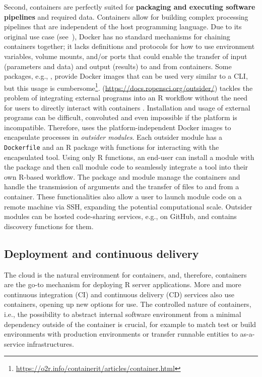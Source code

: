 \label{pipelines} Second, containers are perfectly suited for
\textbf{packaging and executing software pipelines} and required data.
Containers allow for building complex processing pipelines that are
independent of the host programming language. Due to its original use
case (see~), Docker has no standard mechanisms for
chaining containers together; it lacks definitions and protocols for how
to use environment variables, volume mounts, and/or ports that could
enable the transfer of input (parameters and data) and output (results)
to and from containers. Some packages, e.g., , provide
Docker images that can be used very similar to a CLI, but this usage is
cumbersome\footnote{\href{https://o2r.info/containerit/articles/container.html}{https://o2r.info/containerit/articles/container.html}}.
\textbf{} (\url{https://docs.ropensci.org/outsider/})
tackles the problem of integrating external programs into an R workflow
without the need for users to directly interact with containers
\citep{bennett_outsider_2020}. Installation and usage of external
programs can be difficult, convoluted and even impossible if the
platform is incompatible. Therefore,  uses the
platform-independent Docker images to encapsulate processes in
\emph{outsider modules}. Each outsider module has a \texttt{Dockerfile}
and an R package with functions for interacting with the encapsulated
tool. Using only R functions, an end-user can install a module with the
 package and then call module code to seamlessly integrate
a tool into their own R-based workflow. The  package and
module manage the containers and handle the transmission of arguments
and the transfer of files to and from a container. These functionalities
also allow a user to launch module code on a remote machine via SSH,
expanding the potential computational scale. Outsider modules can be
hosted code-sharing services, e.g., on GitHub, and 
contains discovery functions for them.

\hypertarget{deployment-and-continuous-delivery}{%
\subsection{Deployment and continuous
delivery}\label{deployment-and-continuous-delivery}}

\label{deployment}

The cloud is the natural environment for containers, and, therefore,
containers are the go-to mechanism for deploying R server applications.
More and more continuous integration (CI) and continuous delivery (CD)
services also use containers, opening up new options for use. The
controlled nature of containers, i.e., the possibility to abstract
internal software environment from a minimal dependency outside of the
container is crucial, for example to match test or build environments
with production environments or transfer runnable entities to
as-a-service infrastructures.

